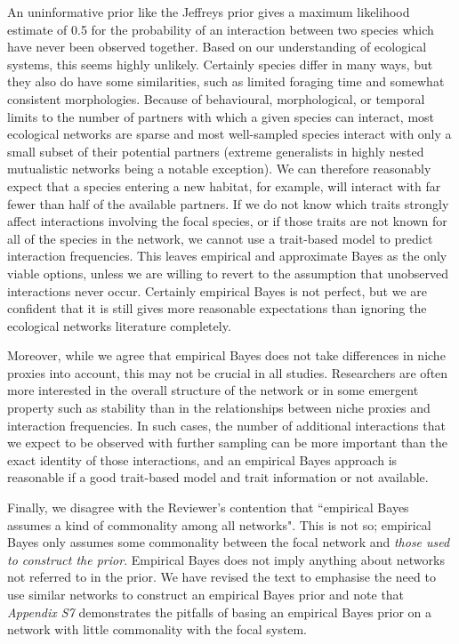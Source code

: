 \documentclass[12pt]{letter}
\begin{document}
		An uninformative prior like the Jeffreys prior gives a maximum likelihood estimate of 0.5 for the probability of an interaction between two species which have never been observed together. Based on our understanding of ecological systems, this seems highly unlikely. Certainly species differ in many ways, but they also do have some similarities, such as limited foraging time and somewhat consistent morphologies. Because of behavioural, morphological, or temporal limits to the number of partners with which a given species can interact, most ecological networks are sparse and most well-sampled species interact with only a small subset of their potential partners (extreme generalists in highly nested mutualistic networks being a notable exception). We can therefore reasonably expect that a species entering a new habitat, for example, will interact with far fewer than half of the available partners. If we do not know which traits strongly affect interactions involving the focal species, or if those traits are not known for all of the species in the network, we cannot use a trait-based model to predict interaction frequencies. This leaves empirical and approximate Bayes as the only viable options, unless we are willing to revert to the assumption that unobserved interactions never occur. Certainly empirical Bayes is not perfect, but we are confident that it is still gives more reasonable expectations than ignoring the ecological networks literature completely.


		Moreover, while we agree that empirical Bayes does not take differences in niche proxies into account, this may not be crucial in all studies. Researchers are often more interested in the overall structure of the network or in some emergent property such as stability than in the relationships between niche proxies and interaction frequencies. In such cases, the number of additional interactions that we expect to be observed with further sampling can be more important than the exact identity of those interactions, and an empirical Bayes approach is reasonable if a good trait-based model and trait information or not available. 


		Finally, we disagree with the Reviewer's contention that ``empirical Bayes assumes a kind of commonality among all networks". This is not so; empirical Bayes only assumes some commonality between the focal network and \emph{those used to construct the prior}. Empirical Bayes does not imply anything about networks not referred to in the prior. We have revised the text to emphasise the need to use similar networks to construct an empirical Bayes prior and note that \emph{Appendix S7} demonstrates the pitfalls of basing an empirical Bayes prior on a network with little commonality with the focal system. 
\end{document}
